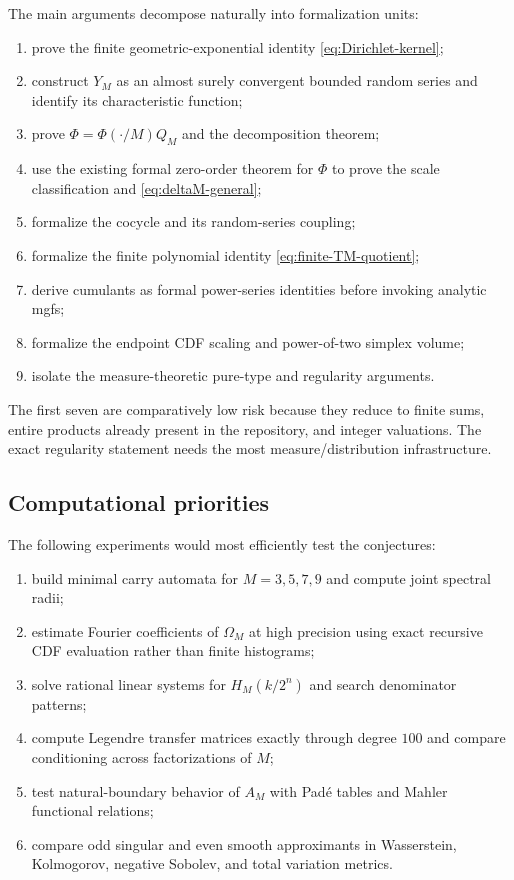 \documentclass[11pt,oneside]{article}
\theoremstyle{definition}
\theoremstyle{remark}
\begin{document}
The main arguments decompose naturally into formalization units:
\begin{enumerate}
\item prove the finite geometric-exponential identity \eqref{eq:Dirichlet-kernel};
\item construct $Y_M$ as an almost surely convergent bounded random series and identify its
characteristic function;
\item prove $\Phi=\Phi(\cdot/M)Q_M$ and the decomposition theorem;
\item use the existing formal zero-order theorem for $\Phi$ to prove the scale
classification and \eqref{eq:deltaM-general};
\item formalize the cocycle and its random-series coupling;
\item formalize the finite polynomial identity \eqref{eq:finite-TM-quotient};
\item derive cumulants as formal power-series identities before invoking analytic mgfs;
\item formalize the endpoint CDF scaling and power-of-two simplex volume;
\item isolate the measure-theoretic pure-type and regularity arguments.
\end{enumerate}
The first seven are comparatively low risk because they reduce to finite sums, entire
products already present in the repository, and integer valuations.  The exact regularity
statement needs the most measure/distribution infrastructure.

\subsection{Computational priorities}

The following experiments would most efficiently test the conjectures:
\begin{enumerate}
\item build minimal carry automata for $M=3,5,7,9$ and compute joint spectral radii;
\item estimate Fourier coefficients of $\Omega_M$ at high precision using exact recursive
CDF evaluation rather than finite histograms;
\item solve rational linear systems for $H_M(k/2^n)$ and search denominator patterns;
\item compute Legendre transfer matrices exactly through degree $100$ and compare
conditioning across factorizations of $M$;
\item test natural-boundary behavior of $A_M$ with Pad\'e tables and Mahler functional
relations;
\item compare odd singular and even smooth approximants in Wasserstein, Kolmogorov,
negative Sobolev, and total variation metrics.
\end{enumerate}
\end{document}

